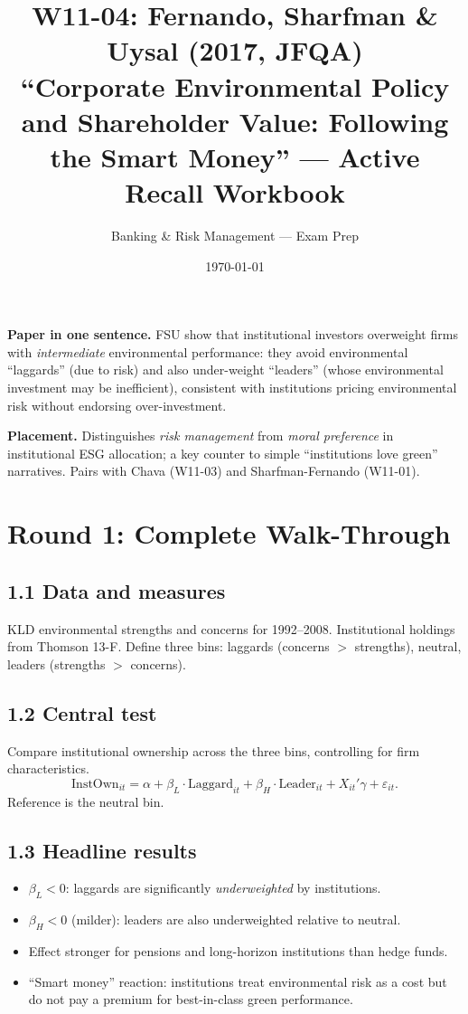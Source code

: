 \documentclass[11pt]{article}
\title{W11-04: Fernando, Sharfman \& Uysal (2017, JFQA) \\
\large ``Corporate Environmental Policy and Shareholder Value: Following the Smart Money'' --- Active Recall Workbook}
\author{Banking \& Risk Management --- Exam Prep}
\date{\today}
\begin{document}
\maketitle

\begin{keybox}
\textbf{Paper in one sentence.} FSU show that institutional investors overweight firms with \emph{intermediate} environmental performance: they avoid environmental ``laggards'' (due to risk) and also under-weight ``leaders'' (whose environmental investment may be inefficient), consistent with institutions pricing environmental risk without endorsing over-investment.

\textbf{Placement.} Distinguishes \emph{risk management} from \emph{moral preference} in institutional ESG allocation; a key counter to simple ``institutions love green'' narratives. Pairs with Chava (W11-03) and Sharfman-Fernando (W11-01).
\end{keybox}

\section*{Round 1: Complete Walk-Through}

\subsection*{1.1 Data and measures}
KLD environmental strengths and concerns for 1992--2008. Institutional holdings from Thomson 13-F. Define three bins: laggards (concerns $>$ strengths), neutral, leaders (strengths $>$ concerns).

\subsection*{1.2 Central test}
Compare institutional ownership across the three bins, controlling for firm characteristics.
\[
\text{InstOwn}_{it}=\alpha+\beta_L\cdot\text{Laggard}_{it}+\beta_H\cdot\text{Leader}_{it}+X_{it}'\gamma+\varepsilon_{it}.
\]
Reference is the neutral bin.

\subsection*{1.3 Headline results}
\begin{itemize}
\item $\beta_L < 0$: laggards are significantly \emph{underweighted} by institutions.
\item $\beta_H < 0$ (milder): leaders are also underweighted relative to neutral.
\item Effect stronger for pensions and long-horizon institutions than hedge funds.
\item ``Smart money'' reaction: institutions treat environmental risk as a cost but do not pay a premium for best-in-class green performance.
\end{itemize}
\end{document}
